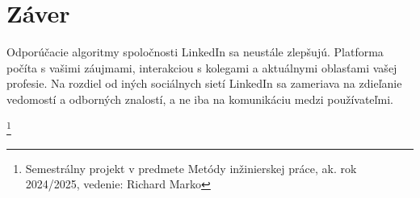 \documentclass[slovak,a4paper]{coursepaper}
\begin{document}
\section{Záver} \label{zaver}
Odporúčacie algoritmy spoločnosti LinkedIn sa neustále zlepšujú. Platforma počíta s vašimi záujmami, interakciou s kolegami a aktuálnymi oblasťami vašej profesie. Na rozdiel od iných sociálnych sietí LinkedIn sa zameriava na zdieľanie vedomostí a odborných znalostí, a ne iba na komunikáciu medzi používateľmi.

\thanks{Semestrálny projekt v predmete Metódy inžinierskej práce, ak. rok 2024/2025, vedenie: Richard Marko}



\end{document}

